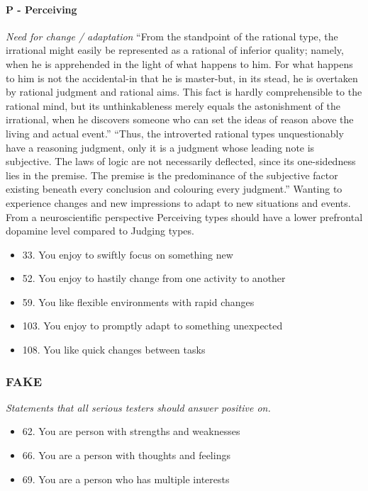\documentclass[11pt,a4paper]{article}
\begin{document}
\paragraph{P - Perceiving}
\emph{Need for change / adaptation}
``From the standpoint of the rational type, the irrational might easily be represented as a rational of inferior quality; namely, when he is apprehended in the light of what happens to him. For what happens to him is not the accidental-in that he is master-but, in its stead, he is overtaken by rational judgment and rational aims. This fact is hardly comprehensible to the rational mind, but its unthinkableness merely equals the astonishment of the irrational, when he discovers someone who can set the ideas of reason above the living and actual event.''\cite[p. 469]{jung1}
``Thus, the introverted rational types unquestionably have a reasoning judgment, only it is a judgment whose leading note is subjective. The laws of logic are not necessarily deflected, since its one-sidedness lies in the premise. The premise is the predominance of the subjective factor existing beneath every conclusion and colouring every judgment.''\cite[p. 496]{jung1}
Wanting to experience changes and new impressions to adapt to new situations and events.
From a neuroscientific perspective Perceiving types should have a lower prefrontal dopamine level compared to Judging types.
\begin{itemize}
  \item 33. You enjoy to swiftly focus on something new
  \item 52. You enjoy to hastily change from one activity to another
  \item 59. You like flexible environments with rapid changes
  \item 103. You enjoy to promptly adapt to something unexpected
  \item 108. You like quick changes between tasks
\end{itemize}

\subsubsection{FAKE}
\emph{Statements that all serious testers should answer positive on.}
\begin{itemize}
  \item 62. You are person with strengths and weaknesses
  \item 66. You are a person with thoughts and feelings
  \item 69. You are a person who has multiple interests
\end{itemize}
\end{document}
